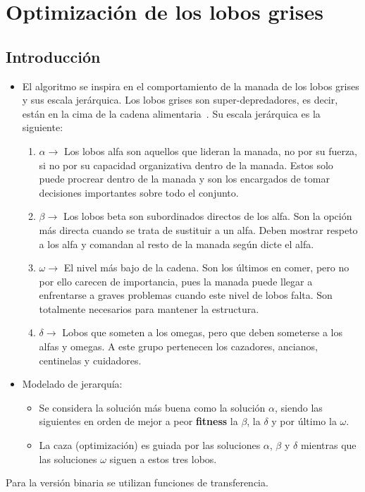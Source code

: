 \section{Optimización de los lobos grises}
\subsection{Introducción}

\begin{itemize}
    \item El algoritmo se inspira en el comportamiento de la manada de los lobos grises y sus escala jerárquica. Los lobos grises son super-depredadores, es decir, están en la cima de la cadena alimentaria~\cite{mirjalili_grey_2014}. Su escala jerárquica es la siguiente:
          \begin{enumerate}
              \item $\alpha\rightarrow$ Los lobos alfa son aquellos que lideran la manada, no por su fuerza, si no por su capacidad organizativa dentro de la manada. Estos solo puede procrear dentro de la manada y son los encargados de tomar decisiones importantes sobre todo el conjunto.
              \item $\beta\rightarrow$ Los lobos beta son subordinados directos de los alfa. Son la opción más directa cuando se trata de sustituir a un alfa. Deben mostrar respeto a los alfa y comandan al resto de la manada según dicte el alfa.
              \item $\omega\rightarrow$ El nivel más bajo de la cadena. Son los últimos en comer, pero no por ello carecen de importancia, pues la manada puede llegar a enfrentarse a graves problemas cuando este nivel de lobos falta. Son totalmente necesarios para mantener la estructura.
              \item $\delta\rightarrow$ Lobos que someten a los omegas, pero que deben someterse a los alfas y omegas. A este grupo pertenecen los cazadores, ancianos, centinelas y cuidadores.
          \end{enumerate}

    \item Modelado de jerarquía:
          \begin{itemize}
              \item Se considera la solución más buena como la solución $\alpha$, siendo las siguientes en orden de mejor a peor \textbf{fitness} la $\beta$, la $\delta$ y por último la $\omega$.
              \item La caza (optimización) es guiada por las soluciones $\alpha$, $\beta$ y $\delta$ mientras que las soluciones $\omega$ siguen a estos tres lobos.
          \end{itemize}
\end{itemize}
Para la versión binaria se utilizan funciones de transferencia.

